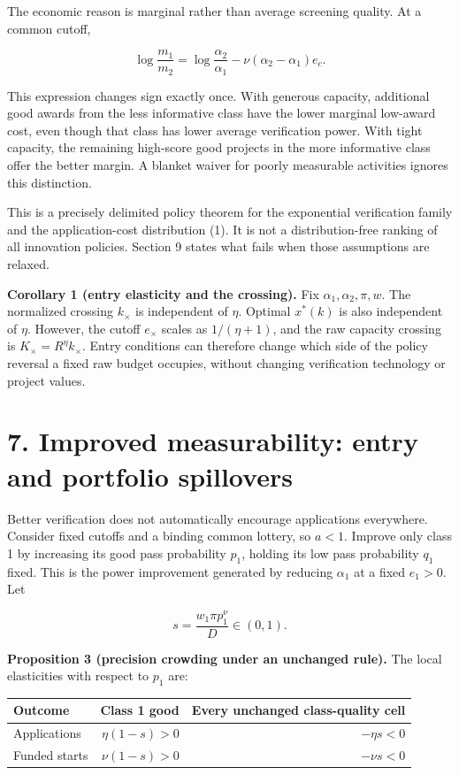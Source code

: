 \documentclass[
  11pt,
]{article}
\begin{document}
The economic reason is marginal rather than average screening quality.
At a common cutoff,

\[\log\frac{m_1}{m_2}=
\log\frac{\alpha_2}{\alpha_1}-\nu(\alpha_2-\alpha_1)e_c. \tag{19}\]

This expression changes sign exactly once. With generous capacity,
additional good awards from the less informative class have the lower
marginal low-award cost, even though that class has lower average
verification power. With tight capacity, the remaining high-score good
projects in the more informative class offer the better margin. A
blanket waiver for poorly measurable activities ignores this
distinction.

This is a precisely delimited policy theorem for the exponential
verification family and the application-cost distribution (1). It is not
a distribution-free ranking of all innovation policies. Section 9 states
what fails when those assumptions are relaxed.

\textbf{Corollary 1 (entry elasticity and the crossing).} Fix
\(\alpha_1,\alpha_2,\pi,w\). The normalized crossing \(k_\times\) is
independent of \(\eta\). Optimal \(x^*(k)\) is also independent of
\(\eta\). However, the cutoff \(e_\times\) scales as \(1/(\eta+1)\), and
the raw capacity crossing is \(K_\times=R^{\eta}k_\times\). Entry
conditions can therefore change which side of the policy reversal a
fixed raw budget occupies, without changing verification technology or
project values.

\section{7. Improved measurability: entry and portfolio
spillovers}\label{improved-measurability-entry-and-portfolio-spillovers}

Better verification does not automatically encourage applications
everywhere. Consider fixed cutoffs and a binding common lottery, so
\(a<1\). Improve only class 1 by increasing its good pass probability
\(p_1\), holding its low pass probability \(q_1\) fixed. This is the
power improvement generated by reducing \(\alpha_1\) at a fixed
\(e_1>0\). Let

\[s=\frac{w_1\pi p_1^{\nu}}{D}\in(0,1).\]

\textbf{Proposition 3 (precision crowding under an unchanged rule).} The
local elasticities with respect to \(p_1\) are:

\begin{longtable}[]{@{}lrr@{}}
\toprule\noalign{}
Outcome & Class 1 good & Every unchanged class-quality cell \\
\midrule\noalign{}
\endhead
\bottomrule\noalign{}
\endlastfoot
Applications & \(\eta(1-s)>0\) & \(-\eta s<0\) \\
Funded starts & \(\nu(1-s)>0\) & \(-\nu s<0\) \\
\end{longtable}
\end{document}
